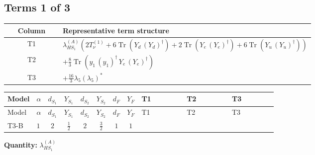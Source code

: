 \documentclass[8pt]{article}
\begin{document}
\begin{landscape}
\subsection*{Terms 1 of 3}
\begin{center}
\begin{tabular}{@{}c >{\raggedright\arraybackslash}p{0.82\linewidth}@{}}
\toprule
Column & Representative term structure \\
\midrule
T1 & \(\displaystyle {\lambda_{HS_1}^{(A)}} (2 T_{\nu}^{(1)}+6 \operatorname{Tr}\!\left({Y_d}\,\left({Y_d}\right)^{\dagger}\right)+2 \operatorname{Tr}\!\left({Y_e}\,\left({Y_e}\right)^{\dagger}\right)+6 \operatorname{Tr}\!\left({Y_u}\,\left({Y_u}\right)^{\dagger}\right))\) \\
\midrule
T2 & \(\displaystyle +\frac{8}{3} \operatorname{Tr}\!\left({y_1}\,\left({y_1}\right)^{\dagger}\,{Y_e}\,\left({Y_e}\right)^{\dagger}\right)\) \\
\midrule
T3 & \(\displaystyle +\frac{16}{3} {\lambda_5} \left({\lambda_5}\right)^{*}\) \\
\midrule
\bottomrule
\end{tabular}
\end{center}
\smallskip
\tiny
\begin{longtable}{@{}llcccccc >{\raggedright\arraybackslash}p{0.21\linewidth} >{\raggedright\arraybackslash}p{0.21\linewidth} >{\raggedright\arraybackslash}p{0.21\linewidth}@{}}
\toprule
Model & $\alpha$ & $d_{S_1}$ & $Y_{S_1}$ & $d_{S_2}$ & $Y_{S_2}$ & $d_F$ & $Y_F$ & T1 & T2 & T3 \\
\midrule
\endfirsthead
\toprule
Model & $\alpha$ & $d_{S_1}$ & $Y_{S_1}$ & $d_{S_2}$ & $Y_{S_2}$ & $d_F$ & $Y_F$ & T1 & T2 & T3 \\
\midrule
\endhead
T3-B & $1$ & $2$ & $\frac{1}{2}$ & $2$ & $\frac{3}{2}$ & $1$ & $1$ & \scriptsize\adjustbox{max width=\linewidth}{$\begin{gathered} {\lambda_{HS_1}^{(A)}} (2 T_{\nu}^{(1)}+6 \operatorname{Tr}\!\left({Y_d}\,\left({Y_d}\right)^{\dagger}\right)+2 \operatorname{Tr}\!\left({Y_e}\,\left({Y_e}\right)^{\dagger}\right)+6 \operatorname{Tr}\!\left({Y_u}\,\left({Y_u}\right)^{\dagger}\right))\end{gathered}$} & \scriptsize\adjustbox{max width=\linewidth}{$\begin{gathered} +\frac{8}{3} \operatorname{Tr}\!\left({y_1}\,\left({y_1}\right)^{\dagger}\,{Y_e}\,\left({Y_e}\right)^{\dagger}\right)\end{gathered}$} & \scriptsize\adjustbox{max width=\linewidth}{$\begin{gathered} +\frac{16}{3} {\lambda_5} \left({\lambda_5}\right)^{*}\end{gathered}$} \\
\midrule
\bottomrule
\end{longtable}
\clearpage
\noindent\textbf{Quantity: }$\lambda_{HS_1}^{(A)}$\par\smallskip

\end{landscape}
\end{document}
